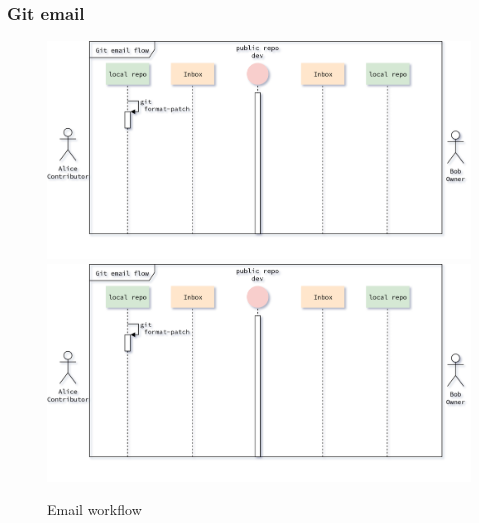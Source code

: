 \begin{frame}
    \frametitle{Git email}
    \begin{figure}
        \begin{center}
            {
                \includegraphics[height=0.7\textheight,keepaspectratio]{./images/EmailWorkflow_PrepareFirstPatch.png}
            }
            {
                \includegraphics[height=0.75\textheight,keepaspectratio]{./images/EmailWorkflow_PrepareFirstPatch.png}
            }
            \caption{Email workflow}
        \end{center}
    \end{figure}
\end{frame}


